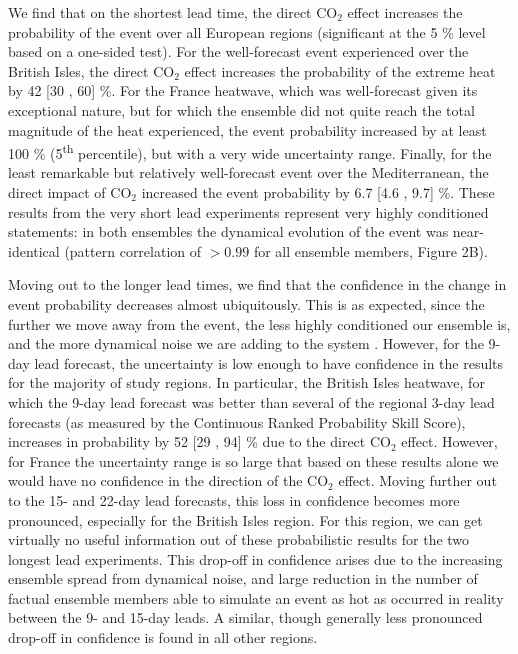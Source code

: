   We find that on the shortest lead time, the direct CO$_2$ effect increases the probability of the event over all European regions (significant at the 5 \% level based on a one-sided test). For the well-forecast event experienced over the British Isles, the direct CO$_2$ effect increases the probability of the extreme heat by 42 [30 , 60] \%. For the France heatwave, which was well-forecast given its exceptional nature, but for which the ensemble did not quite reach the total magnitude of the heat experienced, the event probability increased by at least 100 \% (5\textsuperscript{th} percentile), but with a very wide uncertainty range. Finally, for the least remarkable but relatively well-forecast event over the Mediterranean, the direct impact of CO$_2$ increased the event probability by 6.7 [4.6 , 9.7] \%. These results from the very short lead experiments represent very highly conditioned statements: in both ensembles the dynamical evolution of the event was near-identical (pattern correlation of $>0.99$ for all ensemble members, Figure 2B).
  
  Moving out to the longer lead times, we find that the confidence in the change in event probability decreases almost ubiquitously. This is as expected, since the further we move away from the event, the less highly conditioned our ensemble is, and the more dynamical noise we are adding to the system \citep{shepherd_common_2016}. However, for the 9-day lead forecast, the uncertainty is low enough to have confidence in the results for the majority of study regions. In particular, the British Isles heatwave, for which the 9-day lead forecast was better than several of the regional 3-day lead forecasts (as measured by the Continuous Ranked Probability Skill Score), increases in probability by 52 [29 , 94] \% due to the direct CO$_2$ effect. However, for France the uncertainty range is so large that based on these results alone we would have no confidence in the direction of the CO$_2$ effect. Moving further out to the 15- and 22-day lead forecasts, this loss in confidence becomes more pronounced, especially for the British Isles region. For this region, we can get virtually no useful information out of these probabilistic results for the two longest lead experiments. This drop-off in confidence arises due to the increasing ensemble spread from dynamical noise, and large reduction in the number of factual ensemble members able to simulate an event as hot as occurred in reality between the 9- and 15-day leads. A similar, though generally less pronounced drop-off in confidence is found in all other regions. 
  
